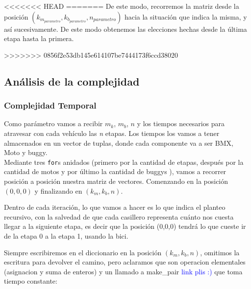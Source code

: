 <<<<<<< HEAD
=======
De este modo, recorremos la matriz  desde la posici\'on $(k_{m_{parametro}},k_{b_{parametro}},n_{parametro})$ hacia la situaci\'on que indica la misma, y as\'i sucesivamente. De este modo obtenemos las elecciones hechas desde la \'ultima etapa hasta la primera.



>>>>>>> 0856f2e53db145e614107be7444173f6ccd38020
\newpage

\subsection{An\'alisis de la complejidad}
\subsubsection{Complejidad Temporal}

Como par\'ametro vamos a recibir $m_k$, $m_b$, $n$ y los tiempos necesarios para atravesar con cada veh\'iculo las \emph{n} etapas. Los tiempos los vamos a tener almacenados en un vector de tuplas, donde cada componente va a ser BMX, Moto y buggy.\\

Mediante tres \texttt{for}s anidados (primero por la cantidad de etapas, despu\'es por la cantidad de motos y por \'ultimo la cantidad de buggys ), vamos a recorrer posici\'on a posici\'on nuestra matriz de vectores. Comenzando en la posici\'on $(0,0,0)$ y finalizando en  $(k_{m},k_{b},n)$.

Dentro de cada iteraci\'on, lo que vamos a hacer es lo que indica el planteo recursivo, con la salvedad de que cada casillero representa cu\'anto nos cuesta llegar a la siguiente etapa, es decir que la posici\'on (0,0,0) tendr\'a lo que cueste ir de la etapa 0 a la etapa 1, usando la bici.

Siempre escribiremos en el diccionario en la posici\'on $(k{_m}, k{_b}, n)$, omitimos la escritura para devolver el camino, pero aclaramos que son operacion elementales (asignacion y suma de enteros) y un llamado a make_pair \textcolor{blue}{link plis :)} que toma tiempo constante:

